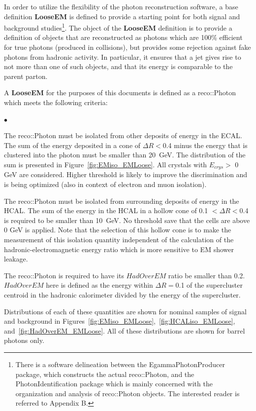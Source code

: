 \documentclass{cmspaper}
\begin{document}
In order to utilize the flexibility of the photon reconstruction software, a base definition {\bf LooseEM} is defined to provide a starting point for both signal and background studies\footnote{There is a software delineation between the EgammaPhotonProducer package, which constructs the actual reco::Photon, and the PhotonIdentification package which is mainly concerned with the organization and analysis of reco::Photon objects.  The interested reader is referred to Appendix B.}.  The object of the {\bf LooseEM} definition is to provide a definition of objects that are reconstructed as photons which are 100\% efficient for true photons (produced in collisions), but provides some rejection against fake photons from hadronic activity. In particular, it ensures that a jet gives rise to not more than one of such objects, and that its energy is comparable to the parent parton. 

A {\bf LooseEM} for the purposes of this documents is defined as a reco::Photon which meets the following criteria:
\begin{list}{$\bullet$}
 \item{The reco::Photon must be isolated from other deposits of energy in the ECAL.  The sum of the energy deposited in a cone
of $\Delta R <$0.4 minus the energy that is clustered into the photon must be smaller than 20~GeV.  The distribution of the sum is presented in 
Figure~\ref{fig:EMiso_EMLoose}. All crystals with $E_{crys} >$ 0 GeV are considered. Higher threshold is likely to improve the discrimination
and is being optimized (also in context of electron and muon isolation).}
 \item{The reco::Photon must be isolated from surrounding deposits of energy in the HCAL.  The sum of the energy in the HCAL in
a hollow cone of 0.1 $< \Delta R<$0.4 is required to be smaller than 10~GeV.  No threshold save that the cells are above 0 GeV is applied.  
Note that the selection of this hollow cone is to make the measurement of this isolation quantity independent of the calculation of the 
hadronic-electromagnetic energy ratio which is more sensitive to EM shower leakage.}
 \item{The reco::Photon is required to have its $HadOverEM$ ratio be smaller than 0.2.  $HadOverEM$ here is defined as the energy within $\Delta R=$0.1 of the supercluster centroid in the hadronic calorimeter divided by the energy of the supercluster.}  
\end{list}

Distributions of each of these quantities are shown for nominal samples of signal and background in Figures~\ref{fig:EMiso_EMLoose},~\ref{fig:HCALiso_EMLoose}, and~\ref{fig:HadOverEM_EMLoose}.  All of these distributions are shown for barrel photons only.
\end{document}
